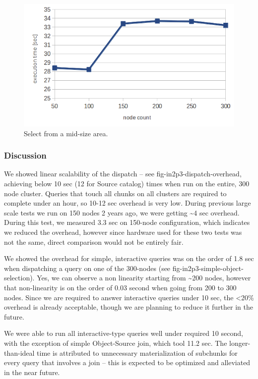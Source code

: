 \documentclass[DM,lsstdraft,toc]{lsstdoc}
\begin{document}
\begin{figure}[H]
\centering
\includegraphics{_static/in2p3_mid_size_area.png}
\caption{Select from a mid-size area.}
\end{figure}

\subsubsection{Discussion}\label{discussion-2}

We showed linear scalability of the dispatch -- see
fig-in2p3-dispatch-overhead, achieving below 10 sec (12 for Source
catalog) times when run on the entire, 300 node cluster. Queries that
touch all chunks on all clusters are required to complete under an hour,
so 10-12 sec overhead is very low. During previous large scale tests we
run on 150 nodes 2 years ago, we were getting \textasciitilde{}4 sec
overhead. During this test, we measured 3.3 sec on 150-node
configuration, which indicates we reduced the overhead, however since
hardware used for these two tests was not the same, direct comparison
would not be entirely fair.

We showed the overhead for simple, interactive queries was on the order
of 1.8 sec when dispatching a query on one of the 300-nodes (see
fig-in2p3-simple-object-selection). Yes, we can observe a non linearity
starting from \textasciitilde{}200 nodes, however that non-linearity is
on the order of 0.03 second when going from 200 to 300 nodes. Since we
are required to answer interactive queries under 10 sec, the
\textless{}20\% overhead is already acceptable, though we are planning
to reduce it further in the future.

We were able to run all interactive-type queries well under required 10
second, with the exception of simple Object-Source join, which tool 11.2
sec. The longer-than-ideal time is attributed to unnecessary
materialization of subchunks for every query that involves a join --
this is expected to be optimized and alleviated in the near future.
\end{document}
